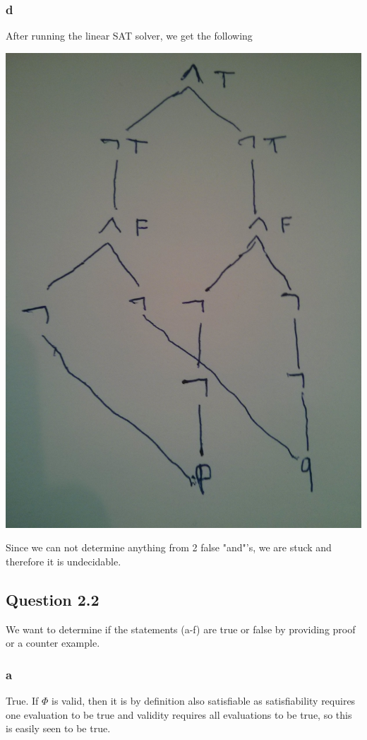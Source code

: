 \documentclass[12pt]{article}
\begin{document}
\newpage

\subsubsection*{d}
After running the linear SAT solver, we get the following
\begin{center}
\includegraphics[scale=0.1]{2}
\end{center}
Since we can not determine anything from 2 false "and"'s, we are stuck and therefore it is undecidable.

\subsection*{Question 2.2}
We want to determine if the statements (a-f) are true or false by providing proof or a counter example.
\subsubsection*{a}
True. If $\Phi$ is valid, then it is by definition also satisfiable as satisfiability requires one evaluation to be true and validity requires all evaluations to be true, so this is easily seen to be true.
\end{document}
